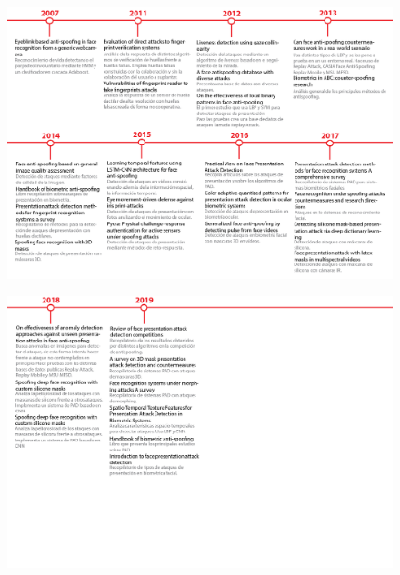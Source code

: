 \begin{landscape}
 \begin{figure}
  \centering
  \includegraphics[width=1.4\textwidth]{ch-sistemasABC/images/ch-ImagenesApendices/CRONOLOGIA_PAD-01.png}
  \label{fig:00_CRONOLOGIA_PAD}
 \end{figure}
\end{landscape}

\begin{landscape}
 \begin{figure}
  \centering
  \includegraphics[width=1.4\textwidth]{ch-sistemasABC/images/ch-ImagenesApendices/CRONOLOGIA_PAD-02.png}
  \label{fig:01_CRONOLOGIA_PAD}
 \end{figure}
\end{landscape}



